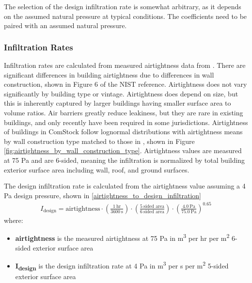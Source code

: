 The selection of the design infiltration rate is somewhat arbitrary, as it depends on the assumed natural pressure at typical conditions. The coefficients need to be paired with an assumed natural pressure.

\subsubsection{Infiltration Rates}
Infiltration rates are calculated from measured airtightness data from \citep{nist_infiltration_data}. There are significant differences in building airtightness due to differences in wall construction, shown in Figure 6 of the NIST reference. Airtightness does not vary significantly by building type or vintage. Airtightness does depend on size, but this is inherently captured by larger buildings having smaller surface area to volume ratios. Air barriers greatly reduce leakiness, but they are rare in existing buildings, and only recently have been required in some jurisdictions. Airtightness of buildings in ComStock follow lognormal distributions with airtightness means by wall construction type matched to those in \citep{nist_infiltration_data}, shown in Figure \ref{fig:airtightness_by_wall_construction_type}.
Airtightness values are measured at 75 Pa and are 6-sided, meaning the infiltration is normalized by total building exterior surface area including wall, roof, and ground surfaces.

The design infiltration rate is calculated from the airtightness value assuming a 4 Pa design pressure, shown in \ref{airtightness_to_design_infiltration}
\begin{align}
\label{airtightness_to_design_infiltration}
I_{\text{design}} = \text{airtightness} \cdot \left(\frac{1\ \text{hr}}{3600\ \text{s}}\right) \cdot \left(\frac{5\ \text{sided area}}{6\ \text{sided area}}\right) \cdot \left(\frac{4.0\ \text{Pa}}{75.0\ \text{Pa}}\right)^{0.65}
\end{align}
where:\\
\begin{itemize}
\item \textbf{airtightness} is the measured airtightness at 75 Pa in m\textsuperscript{3} per hr per m\textsuperscript{2} 6-sided exterior surface area\\
\item \textbf{I\textsubscript{design}} is the design infiltration rate at 4 Pa in m\textsuperscript{3} per s per m\textsuperscript{2} 5-sided exterior surface area\\
\end{itemize}

